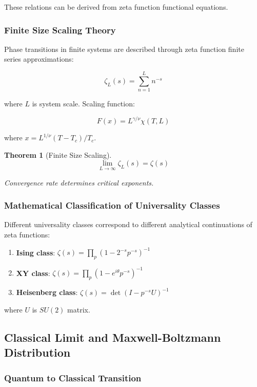 \documentclass[12pt,a4paper]{article}
\newtheorem{theorem}{Theorem}[section]
\begin{document}
These relations can be derived from zeta function functional equations.

\subsubsection{Finite Size Scaling Theory}

Phase transitions in finite systems are described through zeta function finite series approximations:

$$\zeta_L(s) = \sum_{n=1}^{L} n^{-s}$$

where $L$ is system scale. Scaling function:

$$F(x) = L^{\gamma/\nu} \chi(T, L)$$

where $x = L^{1/\nu}(T - T_c)/T_c$.

\begin{theorem}[Finite Size Scaling]
$$\lim_{L \to \infty} \zeta_L(s) = \zeta(s)$$

Convergence rate determines critical exponents.
\end{theorem}

\subsubsection{Mathematical Classification of Universality Classes}

Different universality classes correspond to different analytical continuations of zeta functions:

\begin{enumerate}
\item \textbf{Ising class}: $\zeta(s) = \prod_p (1-2^{-s}p^{-s})^{-1}$
\item \textbf{XY class}: $\zeta(s) = \prod_p (1-e^{i\theta}p^{-s})^{-1}$
\item \textbf{Heisenberg class}: $\zeta(s) = \det(I - p^{-s}U)^{-1}$
\end{enumerate}

where $U$ is $SU(2)$ matrix.

\subsection{Classical Limit and Maxwell-Boltzmann Distribution}

\subsubsection{Quantum to Classical Transition}
\end{document}
